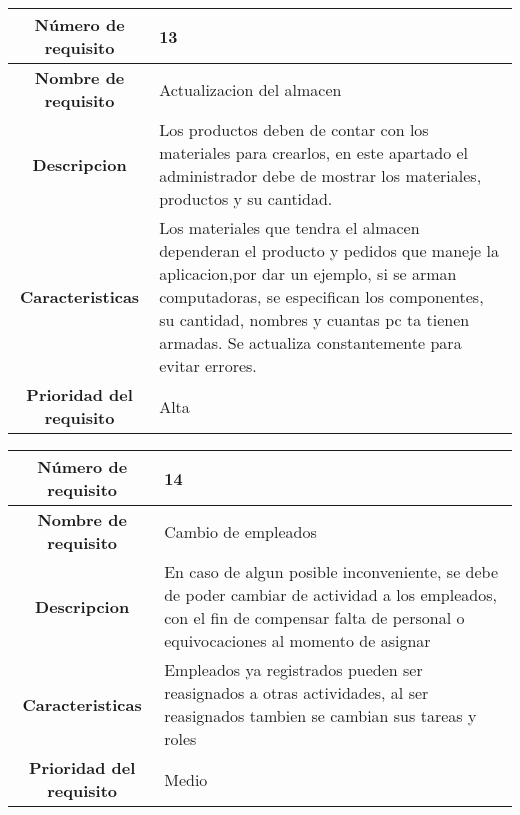 \documentclass[12pt,a4paper, twosite]{article}
\begin{document}
\begin{center}
    \begin{tabular}{|c|p{6cm}|}
        \hline
        \textbf{Número de requisito} & 13 \\ 
        \hline 
        \textbf{Nombre de requisito} & Actualizacion del almacen  \\
        \hline
        \textbf{Descripcion} & Los productos deben de contar con los materiales para crearlos, en este apartado el administrador debe de mostrar los materiales, productos y su cantidad. \\
        \hline
        \textbf{Caracteristicas} & Los materiales que tendra el almacen dependeran el producto y pedidos que maneje la aplicacion,por dar un ejemplo, si se arman computadoras, se especifican los componentes, su cantidad, nombres y cuantas pc ta tienen armadas. Se actualiza constantemente para evitar errores. \\
        \hline
        \textbf{Prioridad del requisito} & Alta  \\
        \hline
     \end{tabular}
\end{center}
\begin{center}
    \begin{tabular}{|c|p{6cm}|}
        \hline
        \textbf{Número de requisito} & 14 \\ 
        \hline
        \textbf{Nombre de requisito} & Cambio de empleados   \\
        \hline
        \textbf{Descripcion} & En caso de algun posible inconveniente, se debe de poder cambiar de actividad a los empleados, con el fin de compensar falta de personal o equivocaciones al momento de asignar  \\
        \hline
        \textbf{Caracteristicas} &Empleados ya registrados pueden ser reasignados a otras actividades, al ser reasignados tambien se cambian sus tareas y roles  \\
        \hline
        \textbf{Prioridad del requisito} & Medio \\
        \hline
     \end{tabular}
\end{center}
\end{document}

